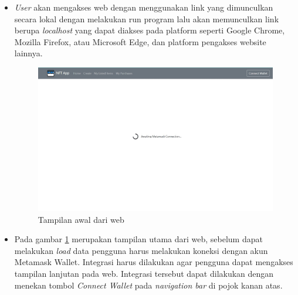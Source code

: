 \begin{itemize}
    \item \emph{User} akan mengakses web dengan menggunakan link yang dimunculkan secara lokal dengan melakukan run program lalu akan memunculkan link berupa \emph{localhost} yang dapat diakses pada platform seperti Google Chrome, Mozilla Firefox, atau Microsoft Edge, dan platform pengakses website lainnya.

    \begin{figure} [H] \centering
      \includegraphics[scale=0.25]{gambar/login_page.jpg}
      \caption{Tampilan awal dari web}
      \label{fig:web_interface}
      \end{figure}

    \item Pada gambar \ref{fig:web_interface} merupakan tampilan utama dari web, sebelum dapat melakukan \emph{load} data pengguna harus melakukan koneksi dengan akun Metamask Wallet. Integrasi harus dilakukan agar pengguna dapat mengakses tampilan lanjutan pada web. Integrasi tersebut dapat dilakukan dengan menekan tombol \emph{Connect Wallet} pada \emph{navigation bar} di pojok kanan atas.
    

\end{itemize}
